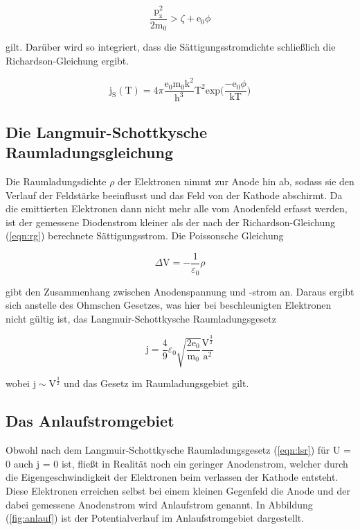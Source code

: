 \begin{equation}
\frac{\text{p}_\text{z}^2}{2\text{m}_0} > \zeta + \text{e}_0 \phi
\end{equation}

\noindent
gilt. Darüber wird so integriert, dass die Sättigungsstromdichte schließlich die Richardson-Gleichung ergibt.

\begin{equation}
\text{j}_\text{S}(\text{T}) = 4\pi \frac{\text{e}_0 \text{m}_0 \text{k}^2}{\text{h}^3} \text{T}^2 \text{exp} \biggl( \frac{-\text{e}_0 \phi}{\text{kT}} \biggr)
\label{eqn:rg}
\end{equation}

\subsection{Die Langmuir-Schottkysche Raumladungsgleichung}
Die Raumladungsdichte $\rho$ der Elektronen nimmt zur Anode hin ab, 
sodass sie den Verlauf der Feldstärke beeinflusst und das Feld von der Kathode abschirmt.
Da die emittierten Elektronen dann nicht mehr alle vom Anodenfeld erfasst werden,
ist der gemessene Diodenstrom kleiner als der nach der Richardson-Gleichung (\ref{eqn:rg}) berechnete Sättigungsstrom.
Die Poissonsche Gleichung

\begin{equation}
\Delta \text{V} = - \frac{1}{\varepsilon_0} \rho
\end{equation}

\noindent
gibt den Zusammenhang zwischen Anodenspannung und -strom an.
Daraus ergibt sich anstelle des Ohmschen Gesetzes, was hier bei beschleunigten Elektronen nicht gültig ist,
das Langmuir-Schottkysche Raumladungsgesetz

\begin{equation}
\text{j}= \frac{4}{9} \varepsilon_0 \sqrt{\frac{2 \text{e}_0}{\text{m}_0}} \frac{\text{V}^{\frac{3}{2}}}{\text{a}^2}
\label{eqn:lsr}
\end{equation}

\noindent
wobei $ \text{j} \sim \text{V}^{\frac{3}{2}}$ und das Gesetz im Raumladungsgebiet gilt.

\subsection{Das Anlaufstromgebiet}

\noindent
Obwohl nach dem Langmuir-Schottkysche Raumladungsgesetz (\ref{eqn:lsr}) für U = 0 auch j = 0 ist, 
fließt in Realität noch ein geringer Anodenstrom, 
welcher durch die Eigengeschwindigkeit der Elektronen beim verlassen der Kathode entsteht.
Diese Elektronen erreichen selbst bei einem kleinen Gegenfeld die Anode und der dabei gemessene Anodenstrom wird Anlaufstrom genannt.
In Abbildung (\ref{fig:anlauf}) ist der Potentialverlauf im Anlaufstromgebiet dargestellt.

